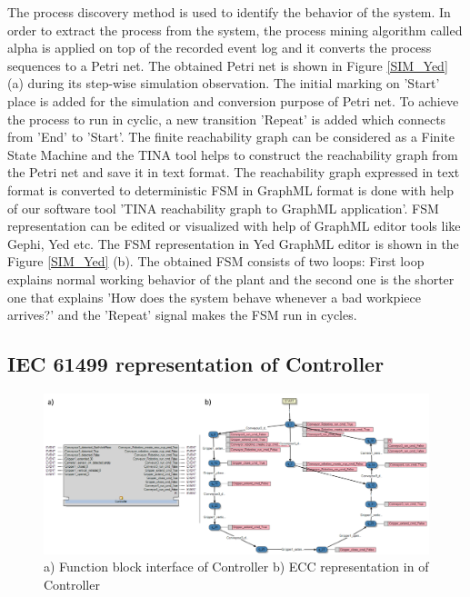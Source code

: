 \documentclass[conference]{IEEEtran}
\begin{document}
The process discovery method is used to identify the behavior of the system. In order to extract the process from the system, the process mining algorithm called alpha  is applied on top of the recorded event log and it converts the process sequences to  a Petri net. The obtained Petri net is shown in Figure \ref{SIM_Yed} (a) during its step-wise simulation observation. The initial marking on ’Start’ place is added for the simulation and conversion purpose of Petri net. To achieve the process to run in cyclic, a new transition ’Repeat’ is added  which connects from ’End’ to ’Start’. The finite reachability graph can be considered as a Finite State Machine and the TINA tool helps to construct the reachability graph from the Petri net and save it in text format. The reachability graph expressed in text format is converted to deterministic FSM in GraphML format is done with help of our software tool 'TINA reachability graph to GraphML application'. FSM representation can be edited or visualized with help of GraphML editor tools like Gephi, Yed etc. The FSM representation in Yed GraphML editor is shown in the Figure \ref{SIM_Yed} (b). The obtained FSM consists of two loops: First loop explains normal working behavior of the plant and the second one is the shorter one that explains ’How does the system behave whenever a bad workpiece arrives?’ and the ’Repeat’ signal makes the FSM run in cycles.
 


\subsection{IEC 61499 representation of Controller}

\begin{figure}[!t]
	\centering
	\includegraphics[width=1\textwidth]{images/FB.PNG}
	\caption{a) Function block interface of Controller b) ECC representation in of Controller}
	\label{SIM_CON_ECC}
\end{figure}
\end{document}

